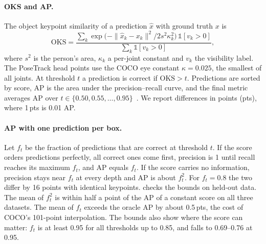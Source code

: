 \documentclass[10pt,twocolumn,letterpaper]{article}
\newcommand{\pts}{\,pts}
\newcommand{\OKS}{\mathrm{OKS}}
\begin{document}
\paragraph{OKS and AP.} The object keypoint similarity of a prediction $\hat x$ with ground truth $x$ is
\begin{equation}
\OKS=\frac{\sum_k\exp\!\big(-\|\hat x_k-x_k\|^2/2s^2\kappa_k^2\big)\,\mathbb 1[v_k>0]}{\sum_k\mathbb 1[v_k>0]},
\end{equation}
where $s^2$ is the person's area, $\kappa_k$ a per-joint constant and $v_k$ the visibility label. The PoseTrack head points use the COCO eye constant $\kappa=0.025$, the smallest of all joints. At threshold $t$ a prediction is correct if $\OKS>t$. Predictions are sorted by score, AP is the area under the precision--recall curve, and the final metric averages AP over $t\in\{0.50,0.55,\ldots,0.95\}$~\cite{coco}. We report differences in points (pts), where 1\pts{} is 0.01 AP.

\paragraph{AP with one prediction per box.} Let $f_t$ be the fraction of predictions that are correct at threshold $t$. If the score orders predictions perfectly, all correct ones come first, precision is 1 until recall reaches its maximum $f_t$, and AP equals $f_t$. If the score carries no information, precision stays near $f_t$ at every depth and AP is about $f_t^2$. For $f_t=0.8$ the two differ by 16 points with identical keypoints.  checks the bounds on held-out data. The mean of $f_t^2$ is within half a point of the AP of a constant score on all three datasets. The mean of $f_t$ exceeds the oracle AP by about 0.5\pts, the cost of COCO's 101-point interpolation. The bounds also show where the score can matter: $f_t$ is at least 0.95 for all thresholds up to 0.85, and falls to 0.69--0.76 at 0.95.

\begin{table}[t]
\centering\small
\setlength{\tabcolsep}{3.5pt}
\caption{The one-prediction bounds against measured AP (fine-tuned ViTPose++ huge, keypoints fixed; AP $\times100$).}
\label{tab:bounds}
\end{table}
\end{document}
